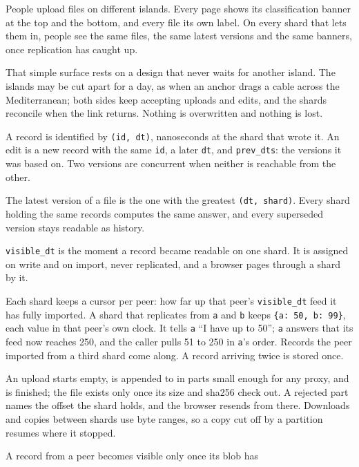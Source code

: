 \documentclass[11pt,oneside]{book}
\providecommand{\tightlist}{\setlength{\itemsep}{0pt}\setlength{\parskip}{0pt}}
\begin{document}
People upload files on different islands. Every page shows its classification
banner at the top and the bottom, and every file its own label. On every shard
that lets them in, people see the same files, the same latest versions and the
same banners, once replication has caught up.

That simple surface rests on a design that never waits for another island. The
islands may be cut apart for a day, as when an anchor drags a cable across the
Mediterranean; both sides keep accepting uploads and edits, and the shards
reconcile when the link returns. Nothing is overwritten and nothing is lost.

\begin{description}\tightlist
\item[Immutable records.] A record is identified by \texttt{(id, dt)},
  nanoseconds at the shard that wrote it. An edit is a new record with the same
  \texttt{id}, a later \texttt{dt}, and \texttt{prev\_dts}: the versions it was
  based on. Two versions are concurrent when neither is reachable from the other.
\item[Latest is a function.] The latest version of a file is the one with the
  greatest \texttt{(dt, shard)}. Every shard holding the same records computes the
  same answer, and every superseded version stays readable as history.
\item[Local visibility.] \texttt{visible\_dt} is the moment a record became
  readable on one shard. It is assigned on write and on import, never replicated,
  and a browser pages through a shard by it.
\item[Anti-entropy.] Each shard keeps a cursor per peer: how far up that peer's
  \texttt{visible\_dt} feed it has fully imported. A shard that
  replicates from \texttt{a} and \texttt{b} keeps \texttt{\{a: 50, b: 99\}}, each
  value in that peer's own clock. It tells \texttt{a} ``I have up to 50''; \texttt{a}
  answers that its feed now reaches 250, and the caller pulls 51 to 250 in
  \texttt{a}'s order. Records the peer imported from a third shard come
  along. A record arriving twice is stored once.
\item[Content in parts.] An upload starts empty, is appended to in parts small
  enough for any proxy, and is finished; the file exists only once its size and
  sha256 check out. A rejected part names the offset the shard holds, and the
  browser resends from there. Downloads and copies between shards use byte ranges,
  so a copy cut off by a partition resumes where it stopped.
\item[Import lanes.] A record from a peer becomes visible only once its blob has

\end{description}
\end{document}
